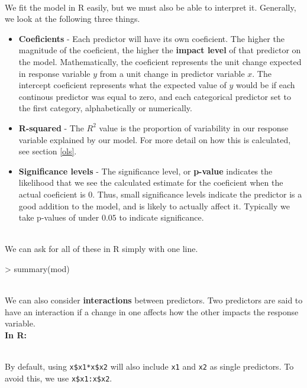\documentclass{article}
\begin{document}
  \\ We fit the model in R easily, but we must also be able to interpret it. Generally, we look at the following three things.
  \begin{itemize}
    \item \textbf{Coeficients} - Each predictor will have its own coeficient. The higher the magnitude of the coeficient, the higher the \textbf{impact level} of that predictor on the model. Mathematically, the coeficient represents the unit change expected in response variable $y$ from a unit change in predictor variable $x$. The intercept coeficient represents what the expected value of $y$ would be if each continous predictor was equal to zero, and each categorical predictor set to the first category, alphabetically or numerically.
    \item \textbf{R-squared} - The $R^2$ value is the proportion of variability in our response variable explained by our model. For more detail on how this is calculated, see section \ref{ols}. 
    \item \textbf{Significance levels} - The significance level, or \textbf{p-value} indicates the likelihood that we see the calculated estimate for the coeficient when the actual coeficient is 0. Thus, small significance levels indicate the predictor is a good addition to the model, and is likely to actually affect it. Typically we take p-values of under $0.05$ to indicate significance.
  \end{itemize}
  \\ We can ask for all of these in R simply with one line.
\begin{Schunk}
\begin{Sinput}
> summary(mod)
\end{Sinput}
\end{Schunk}
  \\ We can also consider \textbf{interactions} between predictors. Two predictors are said to have an interaction if a change in one affects how the other impacts the response variable. 
  \\ \textbf{In R:}
\begin{Schunk}
\end{Schunk}
  \\ By default, using \lstinline{x$x1*x$x2} will also include \lstinline{x1} and \lstinline{x2} as single predictors. To avoid this, we use \lstinline{x$x1:x$x2}.
\end{document}
